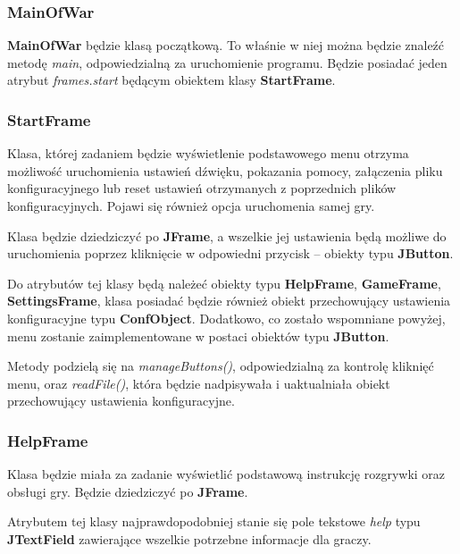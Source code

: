 \documentclass[a4paper]{article}
\begin{document}
\subsubsection{MainOfWar}
\quad \textbf{MainOfWar} b\k{e}dzie klas\k{a} pocz\k{a}tkow\k{a}. To w\l{}a\'snie w niej mo\.zna b\k{e}dzie znale\'z\'c metod\k{e} \textit{main}, odpowiedzialn\k{a} za uruchomienie programu. 
B\k{e}dzie posiada\'c jeden atrybut \textit{frames.start} b\k{e}d\k{a}cym obiektem klasy \textbf{StartFrame}.

\subsubsection{StartFrame}

\quad Klasa, kt\'orej zadaniem b\k{e}dzie wy\'swietlenie podstawowego menu otrzyma mo\.zliwo\'s\'c uruchomienia ustawie\'n d\'zwi\k{e}ku, pokazania pomocy, za\l{}\k{a}czenia pliku konfiguracyjnego lub reset ustawie\'n otrzymanych z poprzednich plik\'ow konfiguracyjnych. 
Pojawi si\k{e} r\'ownie\.z opcja uruchomenia samej gry.

Klasa b\k{e}dzie dziedziczy\'c po \textbf{JFrame}, a wszelkie jej ustawienia b\k{e}d\k{a} mo\.zliwe do uruchomienia poprzez klikni\k{e}cie w odpowiedni przycisk – obiekty typu \textbf{JButton}.

Do atrybut\'ow tej klasy b\k{e}d\k{a} nale\.ze\'c obiekty typu \textbf{HelpFrame}, \textbf{GameFrame}, \textbf{SettingsFrame}, klasa posiada\'c b\k{e}dzie r\'ownie\.z obiekt przechowuj\k{a}cy ustawienia konfiguracyjne typu \textbf{ConfObject}. Dodatkowo, co zosta\l{}o wspomniane powy\.zej, menu zostanie zaimplementowane w postaci obiekt\'ow typu \textbf{JButton}.

Metody podziel\k{a} si\k{e} na \textit{manageButtons()}, odpowiedzialn\k{a} za kontrol\k{e} klikni\k{e}\'c menu, oraz \textit{readFile()}, kt\'ora b\k{e}dzie nadpisywa\l{}a i uaktualnia\l{}a obiekt przechowuj\k{a}cy ustawienia konfiguracyjne.

\subsubsection{HelpFrame}

\quad Klasa b\k{e}dzie mia\l{}a za zadanie wy\'swietli\'c podstawow\k{a} instrukcj\k{e} rozgrywki oraz obs\l{}ugi gry. B\k{e}dzie dziedziczy\'c po \textbf{JFrame}.

Atrybutem tej klasy najprawdopodobniej stanie si\k{e} pole tekstowe \textit{help} typu \textbf{JTextField} zawieraj\k{a}ce wszelkie potrzebne informacje dla graczy.
\end{document}
